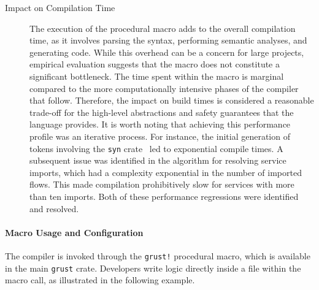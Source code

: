 \begin{description}
    \item[Impact on Compilation Time] The execution of the procedural macro adds to the overall
          compilation time, as it involves parsing the \GRust syntax, performing semantic analyses,
          and generating code. While this overhead can be a concern for large projects, empirical
          evaluation suggests that the \GRust macro does not constitute a significant bottleneck.
          The time spent within the macro is marginal compared to the more computationally intensive
          phases of the \Rust compiler that follow. Therefore, the impact on build times is
          considered a reasonable trade-off for the high-level abstractions and safety guarantees
          that the language provides.
          It is worth noting that achieving this performance profile was an iterative process. For
          instance, the initial generation of \Rust tokens involving the \texttt{syn}
          crate~\cite{syn_rust} led to exponential compile times. A subsequent issue was identified
          in the algorithm for resolving service imports, which had a complexity exponential in the
          number of imported flows. This made compilation prohibitively slow for services with more
          than ten imports. Both of these performance regressions were identified and resolved.
\end{description}

\newpage

\paragraph{Macro Usage and Configuration}

The \GRust compiler is invoked through the \texttt{grust!} procedural macro, which is available in
the main \texttt{grust} crate. Developers write \GRust logic directly inside a \Rust file within
the macro call, as illustrated in the following example.

